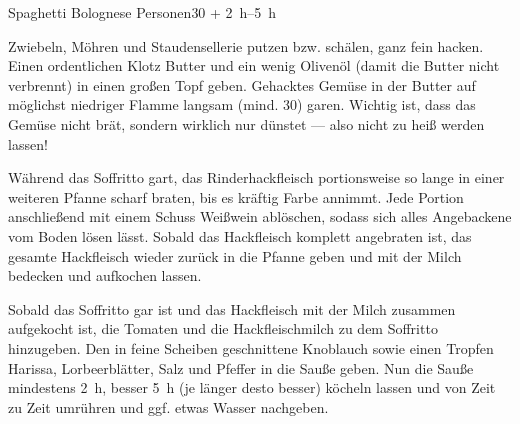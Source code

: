 \begin{MyRecipe}{Spaghetti Bolognese}{ Personen}{\SI{30}{\minuteprime} + \SIrange{2}{5}{\hour}}
	
	
	Zwiebeln, Möhren und Staudensellerie putzen bzw. schälen, ganz fein hacken. Einen ordentlichen Klotz Butter und ein wenig Olivenöl (damit die Butter nicht verbrennt) in einen großen Topf geben. Gehacktes Gemüse in der Butter auf möglichst niedriger Flamme langsam (mind. \SI{30}{\minuteprime}) garen. Wichtig ist, dass das Gemüse nicht brät, sondern wirklich nur dünstet --- also nicht zu heiß werden lassen!\par\bigskip
	
	
	Während das Soffritto gart, das Rinderhackfleisch portionsweise so lange in einer weiteren Pfanne scharf braten, bis es kräftig Farbe annimmt. Jede Portion  anschließend mit einem Schuss Weißwein ablöschen, sodass sich alles Angebackene vom Boden lösen lässt. Sobald das Hackfleisch komplett angebraten ist, das gesamte Hackfleisch wieder zurück in die Pfanne geben und mit der Milch bedecken und aufkochen lassen.\par\bigskip

	
	Sobald das Soffritto gar ist und das Hackfleisch mit der Milch zusammen aufgekocht ist, die Tomaten und die Hackfleischmilch zu dem Soffritto hinzugeben. Den in feine Scheiben geschnittene Knoblauch sowie einen Tropfen Harissa, Lorbeerblätter, Salz und Pfeffer in die Sauße geben. Nun die Sauße mindestens \SI{2}{\hour}, besser \SI{5}{\hour} (je länger desto besser) köcheln lassen und von Zeit zu Zeit umrühren und ggf. etwas Wasser nachgeben.
		
	
	
	
\end{MyRecipe}